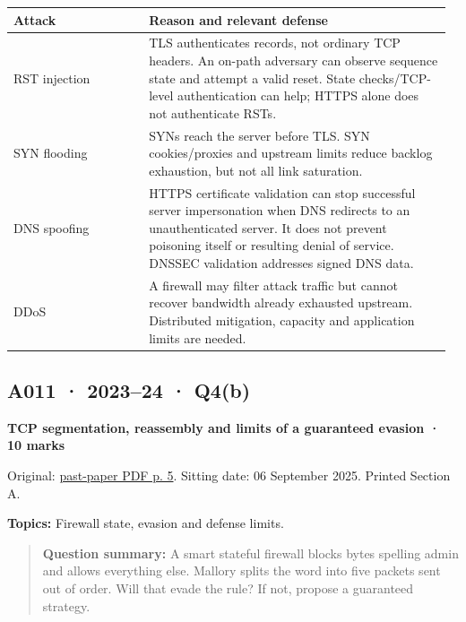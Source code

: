 \documentclass[11pt,a4paper]{article}
\begin{document}
{\small\setlength{\tabcolsep}{3pt}
\begin{longtable}{>{\raggedright\arraybackslash}p{0.30002\linewidth}>{\raggedright\arraybackslash}p{0.67087\linewidth}}
\toprule
\textbf{Attack} & \textbf{Reason and relevant defense} \\
\midrule
\endhead
RST injection & TLS authenticates records,\allowbreak{} not ordinary TCP headers. An on-path adversary can observe sequence state and attempt a valid reset. State checks/\allowbreak{}TCP-level authentication can help; HTTPS alone does not authenticate RSTs. \\
SYN flooding & SYNs reach the server before TLS. SYN cookies/\allowbreak{}proxies and upstream limits reduce backlog exhaustion,\allowbreak{} but not all link saturation. \\
DNS spoofing & HTTPS certificate validation can stop successful server impersonation when DNS redirects to an unauthenticated server. It does not prevent poisoning itself or resulting denial of service. DNSSEC validation addresses signed DNS data. \\
DDoS & A firewall may filter attack traffic but cannot recover bandwidth already exhausted upstream. Distributed mitigation,\allowbreak{} capacity and application limits are needed. \\
\bottomrule
\end{longtable}
}



\clearpage
\subsection{A011 · 2023–24 · Q4(b)}\label{a011}

\textbf{TCP segmentation,\allowbreak{} reassembly and limits of a guaranteed evasion · 10 marks}


Original: \href{../../CSE405-Security_Merged.pdf\#page=5}{past-paper PDF p. 5}. Sitting date: 06 September 2025. Printed Section A.


\textbf{Topics:} Firewall state,\allowbreak{} evasion and defense limits.



\begin{quote}\small

\textbf{Question summary:} A smart stateful firewall blocks bytes spelling admin and allows everything else. Mallory splits the word into five packets sent out of order. Will that evade the rule? If not,\allowbreak{} propose a guaranteed strategy.



\end{quote}
\end{document}
